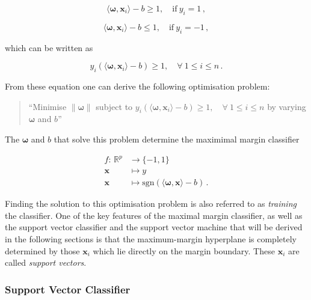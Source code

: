 \begin{equation}
\langle \bm{\omega} , \bm{x}_i \rangle - b \geq 1, \quad \mbox{if} \ y_i = 1\,,
\end{equation}

\begin{equation}
\langle \bm{\omega} , \bm{x}_i \rangle - b \leq 1, \quad \mbox{if} \ y_i = -1\,,
\end{equation}

\noindent
which can be written as

\begin{equation}
y_i (\langle \bm{\omega} , \bm{x}_i \rangle - b) \geq 1, \quad \forall \ 1 \leq i \leq n\,.
\label{eq:constraint}
\end{equation}

\noindent
From these equation one can derive the following optimisation problem:

\begin{quote}
``Minimise $\|\bm{\omega}\|$ subject to $y_i (\langle \bm{\omega} , \bm{x}_i \rangle - b) \geq 1, \quad \forall \ 1 \leq i \leq n$ by varying $\bm{\omega}$ and $b$''
\end{quote}

\noindent
The $\bm{\omega}$ and $b$ that solve this problem determine the maximimal margin classifier

\begin{equation}
\begin{split}
f\colon\, \mathbb{R}^p & \to \{-1, 1\} \\
\bm{x} & \mapsto y \\
\bm{x} & \mapsto \mbox{sgn}(\langle \bm{\omega} , \bm{x} \rangle - b)\,.
\end{split}
\end{equation}

\noindent
Finding the solution to this optimisation problem is also referred to as \emph{training} the classifier. One of the key features of the maximal margin classifier, as well as the support vector classifier and the support vector machine that will be derived in the following sections is that the maximum-margin hyperplane is completely determined by those  $\bm{x}_i$ which lie directly on the margin boundary. These $\bm{x}_i$ are called \emph{support vectors}.

\subsubsection{Support Vector Classifier}

